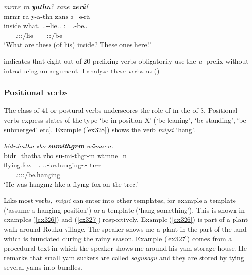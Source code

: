 \begin{exe}
	\ex \emph{mrmr ra \textbf{yathn}? zane \textbf{zerä}!}\\
	\glll mrmr ra y-a-thn zane z=e-rä\\
	inside what.{\Abs} \Tsg.\Masc.\Alph-\Vc-lie.\Ext.{\Ndu} \Dem:{\Prox} \Prox=\Stnsg.\Alph-be.\Ext.\Ndu\\
	~ ~ {\footnotesize \Tsg.\Masc:\Io:\Nonpast:\Ipfv/lie} ~ {\footnotesize \Prox=\Stpl:\Sbj:\Nonpast:\Ipfv/be}\\
	\trans `What are these (of his) inside? These ones here!' 
	\label{ex160}
\end{exe}

 indicates that eight out of 20 prefixing verbs obligatorily use the \emph{a-} prefix without introducing an argument. I analyse these verbs as  (\citealt{Baerman:2006depo}).

\subsubsection{Positional verbs} \label{positionalverbs}

The class of 41  or postural verbs underscores the role of  in the  of S. Positional verbs express states of the type `be in position X' (`be leaning', `be standing', `be submerged' etc). Example (\ref{ex328}) shows the verb \emph{migsi} `hang'.

\begin{exe}
	\ex \emph{bidrthatha zbo \textbf{sumithgrm} wämnen.}\\
	\glll bidr=thatha zbo su-mi-thgr-m wämne=n\\
	{{flying.fox}=\Simil{}} {\Prox.{\All}} \Tsg.\Masc.\Betaone{}-be.hanging-\Stat.\Ndu-\Dur{} tree=\Loc\\
	~ ~ {\footnotesize \Tsg.\Masc:\Sbj:\Pst:\Dur:\Stat/be.hanging} ~\\
	\trans `He was hanging like a flying fox on the tree.' 
	\label{ex328}
\end{exe}

Like most  verbs, \emph{migsi} can enter into other templates, for example a  template (`assume a hanging position') or a  template (`hang something'). This is shown in examples (\ref{ex326}) and (\ref{ex327}) respectively. Example (\ref{ex326}) is part of a plant walk around Rouku village. The speaker shows me a plant in the part of the land which is inundated during the rainy season. Example (\ref{ex327}) comes from a procedural text in which the speaker shows me around his yam storage house. He remarks that small yam suckers are called \emph{sagusagu} and they are stored by tying several yams into bundles.

